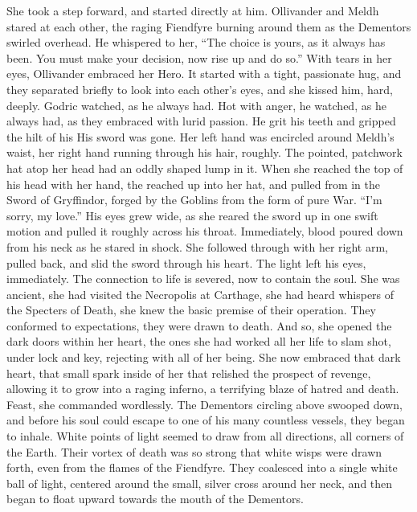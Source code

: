 She took a step forward, and started directly at him. Ollivander and Meldh stared at each other, the raging Fiendfyre burning around them as the Dementors swirled overhead. He whispered to her, “The choice is yours, as it always has been. You must make your decision, now rise up and do so.”
\SmallVSpace
With tears in her eyes, Ollivander embraced her Hero. It started with a tight, passionate hug, and they separated briefly to look into each other’s eyes, and she kissed him, hard, deeply. Godric watched, as he always had. Hot with anger, he watched, as he always had, as they embraced with lurid passion. He grit his teeth and gripped the hilt of his{\el}
\SmallVSpace
{\el}His sword was gone.
\SmallVSpace
Her left hand was encircled around Meldh’s waist, her right hand running through his hair, roughly. The pointed, patchwork hat atop her head had an oddly shaped lump in it. When she reached the top of his head with her hand, the reached up into her hat, and pulled from in the Sword of Gryffindor, forged by the Goblins from the form of pure War.
\SmallVSpace
“I’m sorry, my love.”
\SmallVSpace
His eyes grew wide, as she reared the sword up in one swift motion and pulled it roughly across his throat. Immediately, blood poured down from his neck as he stared in shock. She followed through with her right arm, pulled back, and slid the sword through his heart. The light left his eyes, immediately.
\SmallVSpace
The connection to life is severed, now to contain the soul.
\SmallVSpace
She was ancient, she had visited the Necropolis at Carthage, she had heard whispers of the Specters of Death, she knew the basic premise of their operation. They conformed to expectations, they were drawn to death. And so, she opened the dark doors within her heart, the ones she had worked all her life to slam shot, under lock and key, rejecting with all of her being. She now embraced that dark heart, that small spark inside of her that relished the prospect of revenge, allowing it to grow into a raging inferno, a terrifying blaze of hatred and death.
\SmallVSpace
Feast, she commanded wordlessly. The Dementors circling above swooped down, and before his soul could escape to one of his many countless vessels, they began to inhale. White points of light seemed to draw from all directions, all corners of the Earth. Their vortex of death was so strong that white wisps were drawn forth, even from the flames of the Fiendfyre. They coalesced into a single white ball of light, centered around the small, silver cross around her neck, and then began to float upward towards the mouth of the Dementors.
